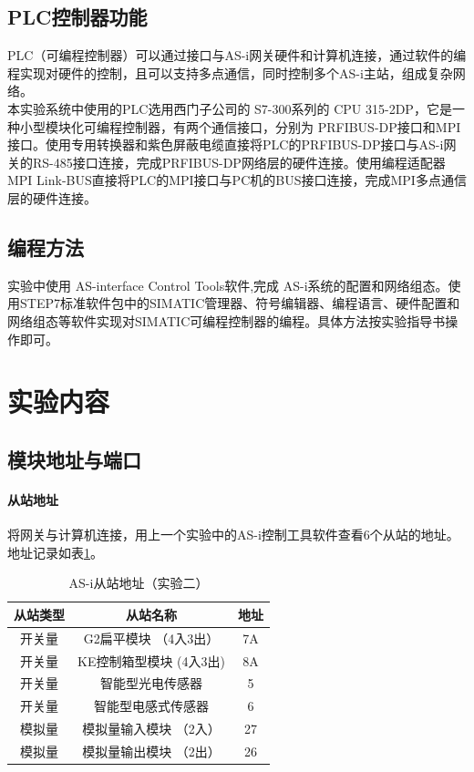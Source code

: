 \subsection{{\ttfamily PLC}控制器功能}
{\ttfamily PLC}（可编程控制器）可以通过接口与AS-i网关硬件和计算机连接，通过软件的编程实现对硬件的控制，且可以支持多点通信，同时控制多个AS-i主站，组成复杂网络。\\
本实验系统中使用的{\ttfamily PLC}选用西门子公司的 {\ttfamily S7-300}系列的 {\ttfamily CPU 315-2DP}，它是一种小型模块化可编程控制器，有两个通信接口，分别为 {\ttfamily PRFIBUS-DP}接口和MPI接口。使用专用转换器和紫色屏蔽电缆直接将{\ttfamily PLC}的{\ttfamily PRFIBUS-DP}接口与{\ttfamily AS-i}网关的{\ttfamily RS-485}接口连接，完成{\ttfamily PRFIBUS-DP}网络层的硬件连接。使用编程适配器{\ttfamily MPI Link-BUS}直接将{\ttfamily PLC}的{\ttfamily MPI}接口与PC机的{\ttfamily BUS}接口连接，完成{\ttfamily MPI}多点通信层的硬件连接。

\subsection{编程方法} 实验中使用 {\ttfamily AS-interface Control Tools}软件,完成 {\ttfamily AS-i}系统的配置和网络组态。使用STEP7标准软件包中的SIMATIC管理器、符号编辑器、编程语言、硬件配置和网络组态等软件实现对SIMATIC可编程控制器的编程。具体方法按实验指导书操作即可。

\section{实验内容}
\subsection{模块地址与端口}
\paragraph{从站地址} 将网关与计算机连接，用上一个实验中的AS-i控制工具软件查看6个从站的地址。地址记录如表\ref{tab:address}。

\begin{table}[htbp]
\centering
\begin{tabular}{|c|c|c|}
	\hline
	从站类型 & 从站名称 & 地址 \\
	\hline
	开关量 & G2扁平模块 （4入3出） & 7A \\
	开关量 & KE控制箱型模块 (4入3出) & 8A \\
	开关量 & 智能型光电传感器 & 5 \\
	开关量 & 智能型电感式传感器 & 6 \\
	模拟量 & 模拟量输入模块 （2入） & 27 \\
	模拟量 & 模拟量输出模块 （2出） & 26 \\
	\hline
\end{tabular}
\caption{AS-i从站地址（实验二）}
\label{tab:address}
\end{table}

